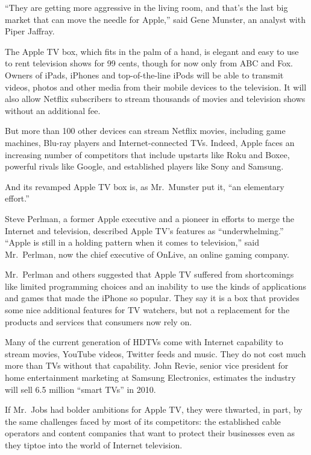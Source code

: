 ﻿\documentclass[12pt]{article}
\begin{document}
``They are getting more aggressive in the living room, and that's the last big market that can move
the needle for Apple,'' said Gene Munster, an analyst with Piper Jaffray.

The Apple TV box, which fits in the palm of a hand, is elegant and easy to use to rent television
shows for 99 cents, though for now only from ABC and Fox. Owners of iPads, iPhones and
top-of-the-line iPods will be able to transmit videos, photos and other media from their mobile
devices to the television. It will also allow Netflix subscribers to stream thousands of movies and
television shows without an additional fee.

But more than 100 other devices can stream Netflix movies, including game machines, Blu-ray players
and Internet-connected TVs. Indeed, Apple faces an increasing number of competitors that include
upstarts like Roku and Boxee, powerful rivals like Google, and established players like Sony and
Samsung.

And its revamped Apple TV box is, as Mr.~Munster put it, ``an elementary effort.''

Steve Perlman, a former Apple executive and a pioneer in efforts to merge the Internet and
television, described Apple TV's features as ``underwhelming.'' ``Apple is still in a holding
pattern when it comes to television,'' said Mr.~Perlman, now the chief executive of OnLive, an
online gaming company.

Mr.~Perlman and others suggested that Apple TV suffered from shortcomings like limited programming
choices and an inability to use the kinds of applications and games that made the iPhone so popular.
They say it is a box that provides some nice additional features for TV watchers, but not a
replacement for the products and services that consumers now rely on.

Many of the current generation of HDTVs come with Internet capability to stream movies, YouTube
videos, Twitter feeds and music. They do not cost much more than TVs without that capability. John
Revie, senior vice president for home entertainment marketing at Samsung Electronics, estimates the
industry will sell 6.5 million ``smart TVs'' in 2010.

If Mr.~Jobs had bolder ambitions for Apple TV, they were thwarted, in part, by the same challenges
faced by most of its competitors: the established cable operators and content companies that want to
protect their businesses even as they tiptoe into the world of Internet television.
\end{document}
